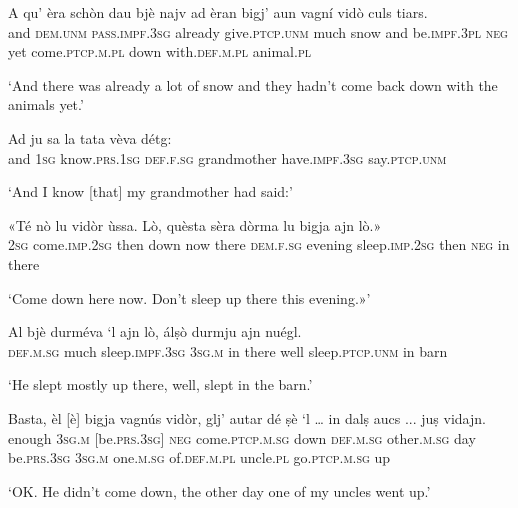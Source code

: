 \largerpage
\begin{linenumbers}
\gll A qu' èra schòn dau bjè najv ad èran bigj’ aun vagní vidò culs tiars.\\  
and \textsc{dem.unm} \textsc{pass.impf.3sg} already give.\textsc{ptcp.unm} much snow and be.\textsc{impf.3pl} \textsc{neg} yet come.\textsc{ptcp.m.pl} down with.\textsc{def.m.pl} animal.\textsc{pl} \\
 \end{linenumbers}
\medskip
\glt `And there was already a lot of snow and they hadn’t come back down with the animals yet.'
\medskip

\begin{linenumbers}
\gll  Ad ju sa la tata vèva détg:   \\
 and \textsc{1sg} know.\textsc{prs.1sg} \textsc{def.f.sg} grandmother have.\textsc{impf.3sg} say.\textsc{ptcp.unm}\\
\end{linenumbers}
\medskip
\glt `And I know [that] my grandmother had said:'

\clearpage

\begin{linenumbers}
\gll «Té nò lu vidòr ùssa. Lò, quèsta sèra dòrma lu bigja ajn lò.»\\
 \textsc{2sg} come.\textsc{imp.2sg} then down now there  \textsc{dem.f.sg} evening sleep.\textsc{imp.2sg} then \textsc{neg} in there\\
\end{linenumbers}
\medskip
\glt `Come down here now. Don’t sleep up there this evening.»'
\medskip

\begin{linenumbers}
\gll  Al bjè durméva `l ajn lò, álṣò durmju ajn nuégl.\\
 \textsc{def.m.sg} much sleep.\textsc{impf.3sg} \textsc{3sg.m} in there well sleep.\textsc{ptcp.unm} in barn\\
\end{linenumbers}
\medskip
\glt `He slept mostly up there, well, slept in the barn.'
\medskip

\begin{linenumbers}
\gll  Basta, èl [è] bigja vagnús vidòr, glj’ autar dé ṣè `l … in dalṣ aucs ... juṣ vidajn.  \\
enough \textsc{3sg.m} [be.\textsc{prs.3sg}] \textsc{neg} come.\textsc{ptcp.m.sg} down \textsc{def.m.sg} other.\textsc{m.sg} day be.\textsc{prs.3sg} \textsc{3sg.m} {} one.\textsc{m.sg} of.\textsc{def.m.pl} uncle.\textsc{pl} {} go.\textsc{ptcp.m.sg} up\\
\end{linenumbers}
\medskip
\glt `OK. He didn’t come down, the other day one of my uncles went up.'
\medskip

